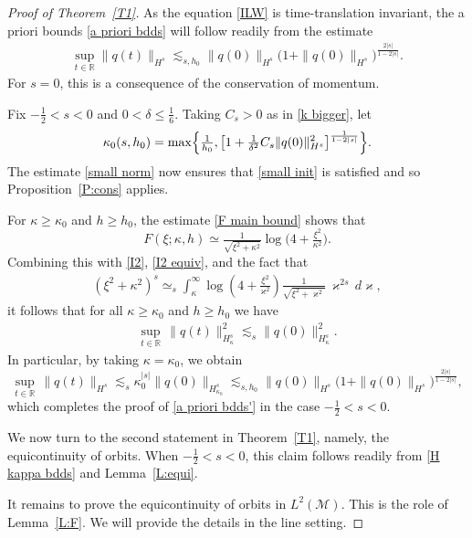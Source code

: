 \documentclass{amsart}
\newcommand{\R}{{\mathbb{R}}}
\theoremstyle{definition}
\theoremstyle{remark}
\begin{document}
\begin{proof}[Proof of Theorem~\ref{T1}]
As the equation \eqref{ILW} is time-translation invariant, the a priori bounds \eqref{a priori bdds} will follow readily from the estimate
\begin{align}\label{a priori bdds'}
 \sup_{t\in \R}\| q(t) \|_{H^s} \lesssim_{s,h_0} \| q(0) \|_{H^s} \bigl( 1 +  \| q(0) \|_{H^s}\bigr)^{\frac{2|s|}{1-2|s|}}.
\end{align}
For $s=0$, this is a consequence of the conservation of momentum.  

Fix $-\frac12<s<0$ and $0<\delta\leq \frac16$.  Taking \(C_s>0\) as in \eqref{k bigger}, let
\[
\kappa_0(s,h_0)=\max\Bigl\{\tfrac1{h_0},\bigl[ 1 + \tfrac1{\delta^2} C_s \| q(0)\|_{H^s}^2 \bigr]^{\frac{1}{1-2|s|}}\Bigr\}.
\]
The estimate \eqref{small norm} now ensures that \eqref{small init} is satisfied and so Proposition~\ref{P:cons} applies.

For \(\kappa\geq \kappa_0\) and \(h\geq h_0\), the estimate \eqref{F main bound} shows that
\[
F(\xi;\kappa,h)\simeq
\tfrac1{\sqrt{\xi^2 + \kappa^2}}\log\bigl(4 + \tfrac{\xi^2}{\kappa^2}\bigr).
\]
Combining this with \eqref{I2}, \eqref{I2 equiv}, and the fact that
\begin{align*}
(\xi^2+\kappa^2)^s \simeq_s \int_{\kappa}^\infty  \log(4+\tfrac{\xi^2}{\varkappa^2})\frac{1}{\sqrt{\xi^2+\varkappa^2}} \,\varkappa^{2s} \,d\varkappa,
\end{align*}
it follows that for all \(\kappa\geq \kappa_0\) and \(h\geq h_0\) we have
\begin{align}\label{H kappa bdds}
\sup_{t\in\R}\, \|q(t)\|_{H^s_{\kappa}}^2 \lesssim_s \| q(0) \|_{H^s_{\kappa}}^2.
\end{align}
In particular, by taking $\kappa=\kappa_0$, we obtain
\begin{equation*}
\sup_{t\in\R}\, \|q(t)\|_{H^s} \lesssim_s \kappa_0^{|s|} \| q(0) \|_{H^s_{\kappa_0}}\lesssim_{s,h_0} \| q(0) \|_{H^s} \bigl( 1 +  \| q(0) \|_{H^s}\bigr)^{\frac{2|s|}{1-2|s|}},
\end{equation*}
which completes the proof of \eqref{a priori bdds'} in the case $-\frac12<s<0$.

We now turn to the second statement in Theorem~\ref{T1}, namely, the equicontinuity of orbits. When $-\frac12<s<0$, this claim follows readily from \eqref{H kappa bdds} and Lemma~\ref{L:equi}.

It remains to prove the equicontinuity of orbits in $L^2(\mathcal M)$. This is the role of Lemma~\ref{L:F}. We will provide the details in the line setting.


\end{proof}
\end{document}
